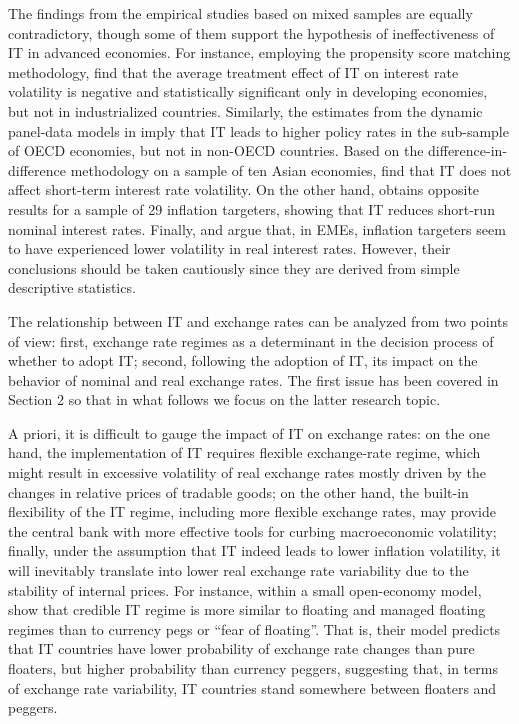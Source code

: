 \documentclass{article}
\begin{document}
The findings from the empirical studies based on mixed samples are equally contradictory, though some of them support the hypothesis of ineffectiveness of IT in advanced economies. For instance, employing the propensity score matching methodology, \citet{ardakani2018} find that the average treatment effect of IT on interest rate volatility is negative and statistically significant only in developing economies, but not in industrialized countries. Similarly, the estimates from the dynamic panel-data models in \citet{fratzscher2020} imply that IT leads to higher policy rates in the sub-sample of OECD economies, but not in non-OECD countries. Based on the difference-in-difference methodology on a sample of ten Asian economies, \citet{naqvi2009} find that IT does not affect short-term interest rate volatility. On the other hand, \citet{petursson2004} obtains opposite results for a sample of 29 inflation targeters, showing that IT reduces short-run nominal interest rates. Finally, \citet{imf2006} and \citet{batini2007} argue that, in EMEs, inflation targeters seem to have experienced lower volatility in real interest rates. However, their conclusions should be taken cautiously since they are derived from simple descriptive statistics.

The relationship between IT and exchange rates can be analyzed from two points of view: first, exchange rate regimes as a determinant in the decision process of whether to adopt IT; second, following the adoption of IT, its impact on the behavior of nominal and real exchange rates. The first issue has been covered in Section 2 so that in what follows we focus on the latter research topic.

A priori, it is difficult to gauge the impact of IT on exchange rates: on the one hand, the implementation of IT requires flexible exchange-rate regime, which might result in excessive volatility of real exchange rates mostly driven by the changes in relative prices of tradable goods; on the other hand, the built-in flexibility of the IT regime, including more flexible exchange rates, may provide the central bank with more effective tools for curbing macroeconomic volatility; finally, under the assumption that IT indeed leads to lower inflation volatility, it will inevitably translate into lower real exchange rate variability due to the stability of internal prices. For instance, within a small open-economy model, \citet{ball2008} show that credible IT regime is more similar to floating and managed floating regimes than to currency pegs or “fear of floating”. That is, their model predicts that IT countries have lower probability of exchange rate changes than pure floaters, but higher probability than currency peggers, suggesting that, in terms of exchange rate variability, IT countries stand somewhere between floaters and peggers.
\end{document}
